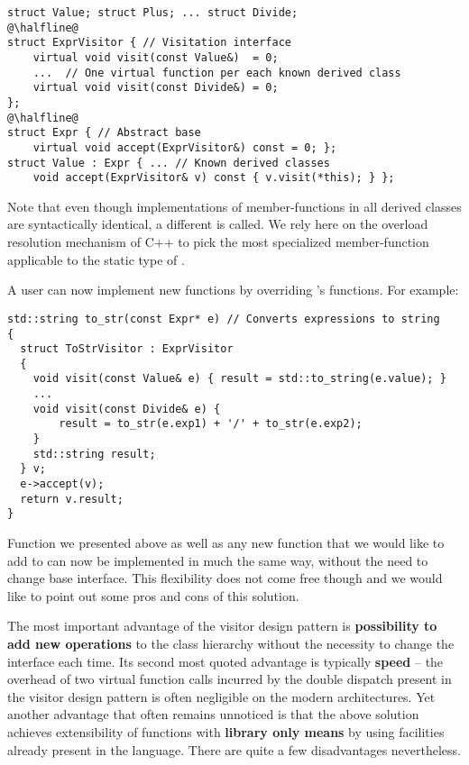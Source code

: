 \begin{lstlisting}
struct Value; struct Plus; ... struct Divide;
@\halfline@
struct ExprVisitor { // Visitation interface
    virtual void visit(const Value&)  = 0;
    ...  // One virtual function per each known derived class
    virtual void visit(const Divide&) = 0;
};
@\halfline@
struct Expr { // Abstract base
    virtual void accept(ExprVisitor&) const = 0; };
struct Value : Expr { ... // Known derived classes
    void accept(ExprVisitor& v) const { v.visit(*this); } };
\end{lstlisting}

\noindent
Note that even though implementations of  member-functions in all 
derived classes are syntactically identical, a different  is called. 
We rely here on the overload resolution mechanism of C++ to pick the most 
specialized  member-function applicable to the static type of 
.


A user can now implement new functions by overriding 's 
functions. For example:

\begin{lstlisting}
std::string to_str(const Expr* e) // Converts expressions to string
{
  struct ToStrVisitor : ExprVisitor
  {
    void visit(const Value& e) { result = std::to_string(e.value); }
    ...
    void visit(const Divide& e) { 
        result = to_str(e.exp1) + '/' + to_str(e.exp2); 
    }
    std::string result;
  } v;
  e->accept(v);
  return v.result;
}
\end{lstlisting}

\noindent
Function  we presented above as well as any new function that we 
would like to add to  can now be implemented in much the same way, 
without the need to change base interface. This flexibility does not come free 
though and we would like to point out some pros and cons of this solution.

The most important advantage of the visitor design pattern is {\bf possibility 
to add new operations} to the class hierarchy without the necessity to change 
the interface each time. Its second most quoted advantage is typically {\bf 
speed} -- the overhead of two virtual function calls incurred by the double 
dispatch present in the visitor design pattern is often negligible on the modern 
architectures. Yet another advantage that often remains unnoticed is that the 
above solution achieves extensibility of functions with {\bf library only means} 
by using facilities already present in the language. There are quite a few 
disadvantages nevertheless.


